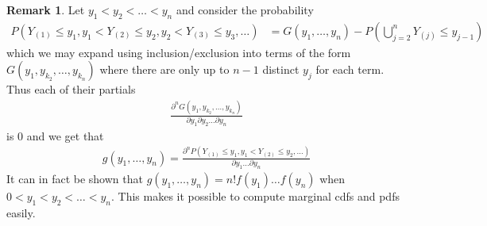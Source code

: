 \documentclass[11pt]{amsart}
\theoremstyle{definition}
\newtheorem{remark}[theorem]{Remark}
\numberwithin{equation}{section}
\begin{document}
 \begin{remark}
     Let $y_1<y_2<\ldots<y_n$ and consider the probability
     \begin{align*}
         P(Y_{(1)}\le y_1,y_1< Y_{(2)}\le y_2,y_2<Y_{(3)}\le y_3,\ldots)&=G(y_1,\ldots,y_n)-P(\bigcup_{j=2}^n Y_{(j)}\le y_{j-1})
     \end{align*}
     which we may expand using inclusion/exclusion into terms of the form $G(y_1,y_{k_{2}},\ldots,y_{k_n})$ where there are only up to $n-1$ distinct $y_j$ for each term. Thus each of their partials
     \begin{align*}
         \frac{\partial^n G(y_1,y_{k_2},\ldots,y_{k_n})}{\partial y_1\partial y_2\ldots\partial y_n}
     \end{align*}
     is 0 and we get that
     \begin{align*}
         g(y_1,\ldots,y_n)=\frac{\partial^n P(Y_{(1)}\le y_1,y_1<Y_{(2)}\le y_2,\ldots)}{\partial y_1\ldots\partial y_n}
     \end{align*}
     It can in fact be shown that $g(y_1,\ldots,y_n)=n!f(y_1)\ldots f(y_n)$ when $0<y_1<y_2<\ldots<y_n$. This makes it possible to compute marginal cdfs and pdfs easily.


\end{remark}
\end{document}
